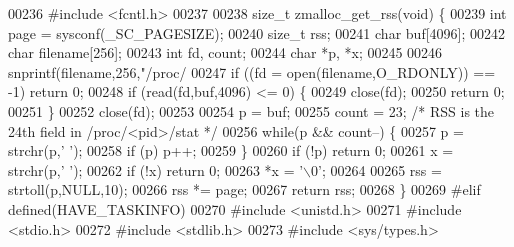 \begin{DoxyCode}
{00236 \textcolor{preprocessor}{#}\textcolor{preprocessor}{include} \textcolor{preprocessor}{<}\textcolor{preprocessor}{fcntl}\textcolor{preprocessor}{.}\textcolor{preprocessor}{h}\textcolor{preprocessor}{>}
00237 
00238 size\_t zmalloc\_get\_rss(\textcolor{keywordtype}{void}) \{
00239     \textcolor{keywordtype}{int} page = sysconf(\_SC\_PAGESIZE);
00240     size\_t rss;
00241     \textcolor{keywordtype}{char} buf[4096];
00242     \textcolor{keywordtype}{char} filename[256];
00243     \textcolor{keywordtype}{int} fd, count;
00244     \textcolor{keywordtype}{char} *p, *x;
00245 
00246     snprintf(filename,256,\textcolor{stringliteral}{"/proc/%
00247     \textcolor{keywordflow}{if} ((fd = open(filename,O\_RDONLY)) == -1) \textcolor{keywordflow}{return} 0;
00248     \textcolor{keywordflow}{if} (read(fd,buf,4096) <= 0) \{
00249         close(fd);
00250         \textcolor{keywordflow}{return} 0;
00251     \}
00252     close(fd);
00253 
00254     p = buf;
00255     count = 23; \textcolor{comment}{/* RSS is the 24th field in /proc/<pid>/stat */}
00256     \textcolor{keywordflow}{while}(p && count--) \{
00257         p = strchr(p,\textcolor{stringliteral}{' '});
00258         \textcolor{keywordflow}{if} (p) p++;
00259     \}
00260     \textcolor{keywordflow}{if} (!p) \textcolor{keywordflow}{return} 0;
00261     x = strchr(p,\textcolor{stringliteral}{' '});
00262     \textcolor{keywordflow}{if} (!x) \textcolor{keywordflow}{return} 0;
00263     *x = \textcolor{stringliteral}{'\(\backslash\)0'};
00264 
00265     rss = strtoll(p,NULL,10);
00266     rss *= page;
00267     \textcolor{keywordflow}{return} rss;
00268 \}
00269 \textcolor{preprocessor}{#}\textcolor{preprocessor}{elif} \textcolor{preprocessor}{defined}\textcolor{preprocessor}{(}\textcolor{preprocessor}{HAVE\_TASKINFO}\textcolor{preprocessor}{)}
00270 \textcolor{preprocessor}{#}\textcolor{preprocessor}{include} \textcolor{preprocessor}{<}\textcolor{preprocessor}{unistd}\textcolor{preprocessor}{.}\textcolor{preprocessor}{h}\textcolor{preprocessor}{>}
00271 \textcolor{preprocessor}{#}\textcolor{preprocessor}{include} \textcolor{preprocessor}{<}\textcolor{preprocessor}{stdio}\textcolor{preprocessor}{.}\textcolor{preprocessor}{h}\textcolor{preprocessor}{>}
00272 \textcolor{preprocessor}{#}\textcolor{preprocessor}{include} \textcolor{preprocessor}{<}\textcolor{preprocessor}{stdlib}\textcolor{preprocessor}{.}\textcolor{preprocessor}{h}\textcolor{preprocessor}{>}
00273 \textcolor{preprocessor}{#}\textcolor{preprocessor}{include} \textcolor{preprocessor}{<}\textcolor{preprocessor}{sys}\textcolor{preprocessor}{/}\textcolor{preprocessor}{types}\textcolor{preprocessor}{.}\textcolor{preprocessor}{h}\textcolor{preprocessor}{>}
}}
\end{DoxyCode}
